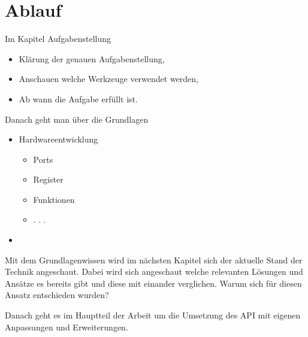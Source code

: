 \section{Ablauf}
Im Kapitel Aufgabenstellung
	\begin{itemize}
		\item Klärung der genauen Aufgabenstellung,
		\item Anschauen welche Werkzeuge verwendet werden,
		\item Ab wann die Aufgabe erfüllt ist.
	\end{itemize}
	
Danach geht man über die Grundlagen
	\begin{itemize}
		\item Hardwareentwicklung
		\begin{itemize}
			\item Ports
			\item Register
			\item Funktionen
			\item . . .
		\end{itemize}
		\item 
	\end{itemize}

Mit dem Grundlagenwissen wird im nächsten Kapitel sich der aktuelle Stand der Technik angeschaut.
Dabei wird sich angeschaut welche relevanten Lösungen und Ansätze es bereits gibt und diese mit einander verglichen.
Warum sich für diesen Ansatz entschieden wurden?

Danach geht es im Hauptteil der Arbeit um die Umsetzung des API mit eigenen Anpassungen und Erweiterungen.








